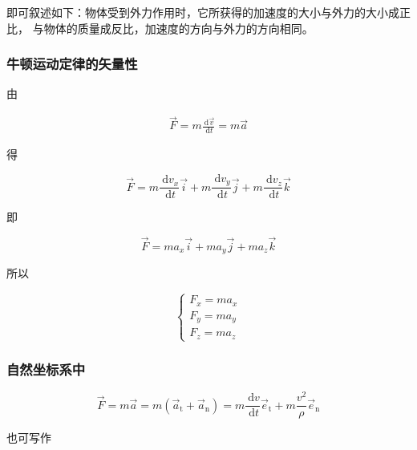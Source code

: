 \documentclass[12pt, a4paper]{article}
\numberwithin{equation}{section}
\newcommand{\rmd}{\mathrm{~d}}
\newcommand{\deriv}[2]{\frac{\rmd #1}{\rmd #2}}
\begin{document}
    即可叙述如下：物体受到外力作用时，它所获得的加速度的大小与外力的大小成正比，
    与物体的质量成反比，加速度的方向与外力的方向相同。

\subsubsection{牛顿运动定律的矢量性}

    由

    \begin{align*}
        \overrightarrow{F} = m \deriv{\overrightarrow{v}}{t} = m \overrightarrow{a}
    \end{align*}

    得

    \begin{equation}
        \overrightarrow{F}=m \frac{\mathrm{~d} v_x}{\mathrm{~d} t} \overrightarrow{i}+m \frac{\mathrm{~d} v_y}{\mathrm{~d} t} \overrightarrow{j}+m \frac{\mathrm{~d} v_z}{\mathrm{~d} t} \overrightarrow{k}
    \end{equation}

    即

    \begin{equation}
        \overrightarrow{F}=m a_x \overrightarrow{i}+m a_y \overrightarrow{j}+m a_z \overrightarrow{k}
    \end{equation}

    所以

    \begin{equation}
        \left\{\begin{array}{l}
        F_x=m a_x \\
        F_y=m a_y \\
        F_z=m a_z
        \end{array}\right.
    \end{equation}

\subsubsection{自然坐标系中}

    \begin{equation}
        \overrightarrow{F}=m \overrightarrow{a}=
        m\left(\overrightarrow{a}_{\mathrm{t}}+\overrightarrow{a}_{\mathrm{n}}\right)=
        m \frac{\mathrm{~d} v}{\mathrm{~d} t} \overrightarrow{e}_{\mathrm{t}}+m \frac{v^2}{\rho} \overrightarrow{e}_{\mathrm{n}}
    \end{equation}

    也可写作
\end{document}
